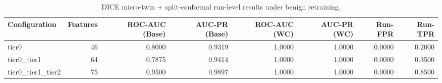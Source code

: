 \begin{table}[t]
\centering
\caption{DICE micro-twin + split-conformal run-level results under benign retraining.}
\label{tab:dice_full_overall}
\footnotesize
\begin{tabular}{lrrrrrrr}
\toprule
Configuration & Features & ROC-AUC (Base) & AUC-PR (Base) & ROC-AUC (WC) & AUC-PR (WC) & Run-FPR & Run-TPR \\
\midrule
tier0 & 46 & 0.8000 & 0.9319 & 1.0000 & 1.0000 & 0.0000 & 0.2000 \\
tier0_tier1 & 64 & 0.7875 & 0.9414 & 1.0000 & 1.0000 & 0.0000 & 0.3500 \\
tier0_tier1_tier2 & 75 & 0.9500 & 0.9897 & 1.0000 & 1.0000 & 0.0000 & 0.8500 \\
\bottomrule
\end{tabular}

\end{table}
